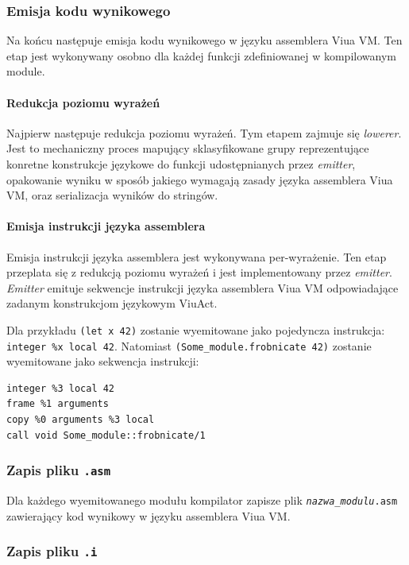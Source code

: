 \documentclass[11pt,oneside,a4paper,titlepage,onecolumn]{article}
\begin{document}
\subsubsection{Emisja kodu wynikowego}

Na końcu następuje emisja kodu wynikowego w języku assemblera Viua VM. Ten etap jest wykonywany osobno dla
każdej funkcji zdefiniowanej w kompilowanym module.

\paragraph{Redukcja poziomu wyrażeń}

Najpierw następuje redukcja poziomu wyrażeń. Tym etapem zajmuje się \emph{lowerer}. Jest to mechaniczny proces
mapujący sklasyfikowane grupy reprezentujące konretne konstrukcje językowe do funkcji udostępnianych przez
\emph{emitter}, opakowanie wyniku w sposób jakiego wymagają zasady języka assemblera Viua VM, oraz
serializacja wyników do stringów.

\paragraph{Emisja instrukcji języka assemblera}

Emisja instrukcji języka assemblera jest wykonywana per-wyrażenie. Ten etap przeplata się z redukcją poziomu
wyrażeń i jest implementowany przez \emph{emitter}. \emph{Emitter} emituje sekwencje instrukcji języka
assemblera Viua VM odpowiadające zadanym konstrukcjom językowym ViuAct.

Dla przykładu \texttt{(let x 42)} zostanie wyemitowane jako pojedyncza instrukcja: \texttt{integer \%x local
42}.  Natomiast \texttt{(Some\_module.frobnicate 42)} zostanie wyemitowane jako sekwencja instrukcji:

\begin{lstlisting}
integer %3 local 42
frame %1 arguments
copy %0 arguments %3 local
call void Some_module::frobnicate/1
\end{lstlisting}

\subsubsection{Zapis pliku \texttt{.asm}}

Dla każdego wyemitowanego modułu kompilator zapisze plik \texttt{\emph{nazwa\_modulu}.asm} zawierający kod
wynikowy w języku assemblera Viua VM.

\subsubsection{Zapis pliku \texttt{.i}}
\end{document}

